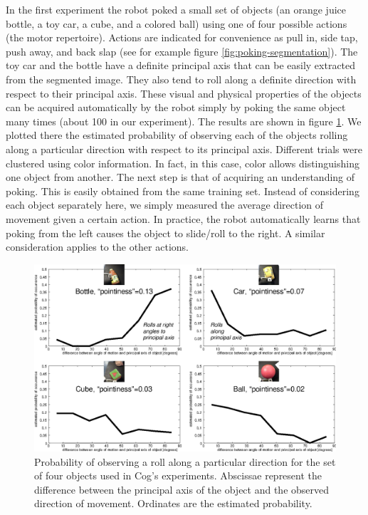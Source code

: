In the first experiment the robot poked a small set of objects 
(an orange juice bottle, a toy car, a cube, and a colored ball) using 
one of four possible actions (the motor repertoire). Actions are 
indicated for convenience as pull in, side tap, push away, and back 
slap (see for example figure \ref{fig:poking-segmentation}). 
The toy car and the bottle have a definite principal axis that 
can be easily extracted from the segmented image. They also tend to 
roll along a definite direction with respect to their principal axis. 
These visual and physical properties of the objects can be acquired 
automatically by the robot simply by poking the same object many times 
(about 100 in our experiment). The results are shown in figure 
\ref{fig:affordances}. We plotted there the estimated probability 
of observing each of the objects rolling along a particular direction 
with respect to its principal axis. Different trials were clustered 
using color information. In fact, in this case, color allows 
distinguishing one object from another. The next step is that of 
acquiring an understanding of poking. This is easily obtained from 
the same training set. Instead of considering each object separately 
here, we simply measured the average direction of movement given a 
certain action. In practice, the robot automatically learns that 
poking from the left causes the object to slide/roll to the right. 
A similar consideration applies to the other actions.

%
%
\begin{figure}[tb]
\begin{center}
\includegraphics[width=\columnwidth]{affordances.eps}
\caption{ 
\label{fig:affordances}
%
%
Probability of observing a roll along a particular direction for the set of
four objects used in Cog's experiments. Abscissae represent the difference
between the principal axis of the object and the observed direction of movement.
Ordinates are the estimated probability.
}
\end{center}
\end{figure}
%
%


